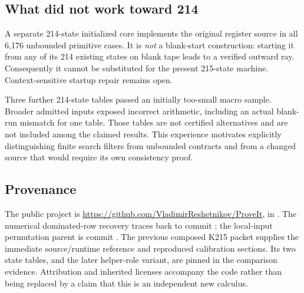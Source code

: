 \subsection{What did not work toward 214}
A separate 214-state initialized core implements the original register source in all 6,176 unbounded primitive cases. It is \emph{not} a blank-start construction: starting it from any of its 214 existing states on blank tape leads to a verified outward ray. Consequently it cannot be substituted for the present 215-state machine. Context-sensitive startup repair remains open.

Three further 214-state tables passed an initially too-small macro sample. Broader admitted inputs exposed incorrect arithmetic, including an actual blank-run mismatch for one table. Those tables are not certified alternatives and are not included among the claimed results. This experience motivates explicitly distinguishing finite search filters from unbounded contracts and from a changed source that would require its own consistency proof.

\subsection{Provenance}
The public project is
\url{https://github.com/VladimirReshetnikov/ProveIt}, in
. The numerical dominated-row recovery traces back to commit
; the local-input permutation parent is commit
. The previous composed K215 packet supplies the immediate source/runtime reference and reproduced calibration sections. Its two state tables, and the later helper-role variant, are pinned in the comparison evidence. Attribution and inherited licenses accompany the code rather than being replaced by a claim that this is an independent new calculus.
